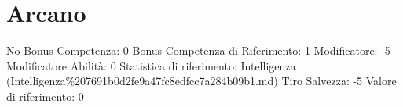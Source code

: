 \section{Arcano}\label{arcano}

\begin{description}
\tightlist
\item[Tags: ABI]
No Bonus Competenza: 0 Bonus Competenza di Riferimento: 1 Modificatore:
-5 Modificatore Abilità: 0 Statistica di riferimento: Intelligenza
(Intelligenza\%207691b0d2fe9a47fc8edfcc7a284b09b1.md) Tiro Salvezza: -5
Valore di riferimento: 0
\end{description}
